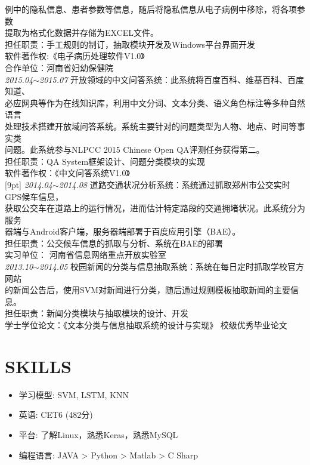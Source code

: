 \documentclass[line, margin]{res}
\newcommand{\xiaowu}{\fontsize{9pt}{15.75pt}\selectfont} %
\begin{document}
\begin{resume}
{{ 例中的隐私信息、患者参数等信息，随后将隐私信息从电子病例中移除，将各项参数\\
 提取为格式化数据并存储为EXCEL文件。\\
 {\xiaowu 担任职责：手工规则的制订，抽取模块开发及Windows平台界面开发}\\
 {\xiaowu 软件著作权:《电子病历处理软件V1.0》} \\
 {\xiaowu 合作单位：河南省妇幼保健院} }\\
[9pt]
 {\sl 2015.04$\sim$2015.07} 开放领域的中文问答系统：{ 此系统将百度百科、维基百科、百度知道、\\
 必应网典等作为在线知识库，利用中文分词、文本分类、语义角色标注等多种自然语言\\
 处理技术搭建开放域问答系统。系统主要针对的问题类型为人物、地点、时间等事实类\\
 问题。此系统参与NLPCC 2015 Chinese Open QA评测任务获得第二。}\\
 {\xiaowu 担任职责：QA System框架设计、问题分类模块的实现}\\
 {\xiaowu 软件著作权：《中文问答系统V1.0》} \\
[9pt]
 {\sl 2014.04$\sim$2014.08} 道路交通状况分析系统：{ 系统通过抓取郑州市公交实时GPS候车信息，\\
 获取公交车在道路上的运行情况，进而估计特定路段的交通拥堵状况。此系统分为服务\\
 器端与Android客户端，服务器端部署于百度应用引擎（BAE）。 \\
 {\xiaowu 担任职责：公交候车信息的抓取与分析、系统在BAE的部署}\\
 {\xiaowu 实习单位： 河南省信息网络重点开放实验室} }\\
[9pt]
 {\sl 2013.10$\sim$2014.05} 校园新闻的分类与信息抽取系统：{ 系统在每日定时抓取学校官方网站\\
 的新闻公告后，使用SVM对新闻进行分类，随后通过规则模板抽取新闻的主要信息。}\\
 {\xiaowu 担任职责：新闻分类模块与抽取模块的设计、开发}\\
 {\xiaowu 学士学位论文：《文本分类与信息抽取系统的设计与实现》 校级优秀毕业论文}} \\
 
\section{SKILLS}
\begin{itemize}
\item { 学习模型: }SVM, LSTM, KNN
\item { 英语: CET6 (482分)}
\item { 平台: 了解Linux，熟悉Keras，熟悉MySQL}
\item { 编程语言: }JAVA > Python > Matlab > C Sharp
\end{itemize}


\end{resume}
\end{document}
